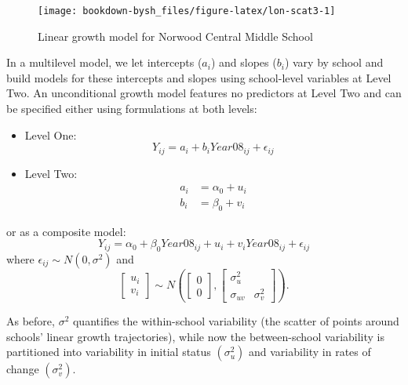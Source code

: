 \documentclass[
]{krantz}
\begin{document}
\begin{figure}

{\centering \texttt{[image: bookdown-bysh\_files/figure-latex/lon-scat3-1]} 

}

\caption{Linear growth model for Norwood Central Middle School}\label{fig:lon-scat3}
\end{figure}

In a multilevel model, we let intercepts (\(a_{i}\)) and slopes (\(b_{i}\)) vary by school and build models for these intercepts and slopes using school-level variables at Level Two. An unconditional growth model features no predictors at Level Two and can be specified either using formulations at both levels:

\begin{itemize}
\item
  Level One:
  \begin{equation}
  Y_{ij}=a_{i}+b_{i}Year08_{ij} + \epsilon_{ij}
  \end{equation}
\item
  Level Two:
  \begin{align*}
  a_{i}&=\alpha_{0} + u_{i}\\
  b_{i}&=\beta_{0} + v_{i}
  \end{align*}
\end{itemize}

or as a composite model:
\begin{equation}
Y_{ij}=\alpha_{0} + \beta_{0}Year08_{ij}+u_{i}+v_{i}Year08_{ij} + \epsilon_{ij}
\end{equation}
where \(\epsilon_{ij}\sim N(0,\sigma^2)\) and
\[ \left[ \begin{array}{c}
            u_{i} \\ v_{i}
          \end{array}  \right] \sim N \left( \left[
          \begin{array}{c}
            0 \\ 0
          \end{array} \right], \left[
          \begin{array}{cc}
            \sigma_{u}^{2} & \\
            \sigma_{uv} & \sigma_{v}^{2}
          \end{array} \right] \right) . \]

As before, \(\sigma^2\) quantifies the within-school variability (the scatter of points around schools' linear growth trajectories), while now the between-school variability is partitioned into variability in initial status \((\sigma^2_u)\) and variability in rates of change \((\sigma^2_v)\).
\end{document}
